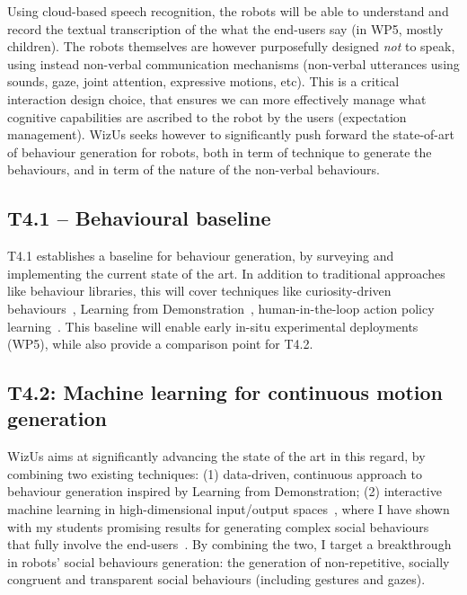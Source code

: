 \documentclass[11pt,a4paper]{report}
\newcommand{\project}{WizUs\xspace}
\begin{document}
Using cloud-based speech recognition, the robots will be able to understand and
record the textual transcription of the what the end-users say (in WP5, mostly
children). The robots themselves are however purposefully designed \emph{not} to
speak, using instead non-verbal communication mechanisms (non-verbal utterances
using sounds, gaze, joint attention, expressive motions, etc). This is a
critical interaction design choice, that ensures we can more effectively manage
what cognitive capabilities are ascribed to the robot by the users (expectation
management).  \project seeks however to significantly push forward the
state-of-art of behaviour generation for robots, both in term of technique to
generate the behaviours, and in term of the nature of the non-verbal behaviours.


\subsection{T4.1 -- Behavioural baseline}

T4.1 establishes a baseline for behaviour
generation, by surveying and implementing the current state of the art. In
addition to traditional approaches like behaviour libraries, this will cover
techniques like curiosity-driven behaviours~\cite{oudeyer2005playground},
Learning from Demonstration~\cite{billard2008robot, argall2009survey},
human-in-the-loop action policy learning~\cite{senft2016sparc,
senft2019teaching}. This baseline will enable early in-situ experimental
deployments (WP5), while also provide a comparison point for T4.2.

\subsection{T4.2: Machine learning for continuous motion generation}

\project aims
at significantly advancing the state of the art in this regard, by combining two
existing techniques: (1) data-driven, continuous approach to behaviour
generation inspired by Learning from Demonstration; (2) interactive machine
learning in high-dimensional input/output spaces~\cite{senft2020woz}, where I
have shown with my students promising results for generating complex social
behaviours~\cite{senft2019teaching, winkle2020couch} that fully involve the
end-users~\cite{winkle2018social}.  By combining the two, I target
a breakthrough in robots' social behaviours generation: the generation of
non-repetitive, socially congruent and transparent social behaviours (including
gestures and gazes).
\end{document}
